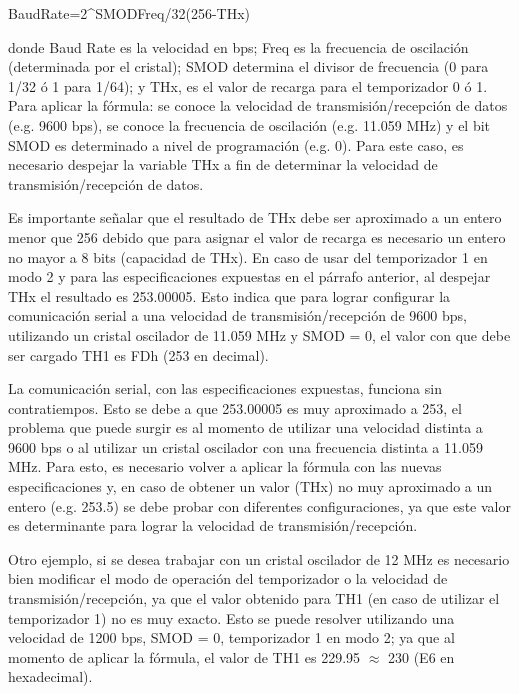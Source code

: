 	\begin{ecuacion}{}
		BaudRate={2^{SMOD}\times Freq}/{32\times\left(256-THx\right)}
	\end{ecuacion}
	
	donde Baud Rate es la velocidad en bps; Freq es la frecuencia de oscilación 
	(determinada por el cristal); SMOD determina el divisor de frecuencia (0 para 1/32 ó 
	1 para 1/64); y THx, es el valor de recarga para el temporizador 0 ó 1. 
	 Para aplicar la fórmula: se conoce la velocidad de transmisión/recepción de 
	datos (e.g. 9600 bps), se conoce la frecuencia de oscilación (e.g. 11.059 MHz) y el bit 
	SMOD es determinado a nivel de programación (e.g. 0). Para este caso, es necesario 
	despejar la variable THx a fin de determinar la velocidad de transmisión/recepción de 
	datos. 
	
	 Es importante señalar que el resultado de THx debe ser aproximado a un 
	entero menor que 256 debido que para asignar el valor de recarga es necesario un 
	entero no mayor a 8 bits (capacidad de THx). En caso de usar del temporizador 1 en 
	modo 2 y para las especificaciones expuestas en el párrafo anterior, al despejar THx 
	el resultado es 253.00005. Esto indica que para lograr configurar la comunicación 
	serial a una velocidad de transmisión/recepción de 9600 bps, utilizando un cristal 
	oscilador de 11.059 MHz y SMOD = 0, el valor con que debe ser cargado TH1 es 
	FDh (253 en decimal). 
	
	 La comunicación serial, con las especificaciones expuestas, funciona sin 
	contratiempos. Esto se debe a que 253.00005 es muy aproximado a 253, el problema 
	que puede surgir es al momento de utilizar una velocidad distinta a 9600 bps o al 
	utilizar un cristal oscilador con una frecuencia distinta a 11.059 MHz. Para esto, es 
	necesario volver a aplicar la fórmula con las nuevas especificaciones y, en caso de 
	obtener un valor (THx) no muy aproximado a un entero (e.g. 253.5) se debe probar 
	con diferentes configuraciones, ya que este valor es determinante para lograr la 
	velocidad de transmisión/recepción. 
	
	 Otro ejemplo, si se desea trabajar con un cristal oscilador de 12 MHz es 
	necesario bien modificar el modo de operación del temporizador o la velocidad de 
	transmisión/recepción, ya que el valor obtenido para TH1 (en caso de utilizar el 
	temporizador 1) no es muy exacto. Esto se puede resolver utilizando una velocidad de 
	1200 bps, SMOD = 0, temporizador 1 en modo 2; ya que al momento de aplicar la 
	fórmula, el valor de TH1 es 229.95 $\approx$ 230 (E6 en hexadecimal). 
	
